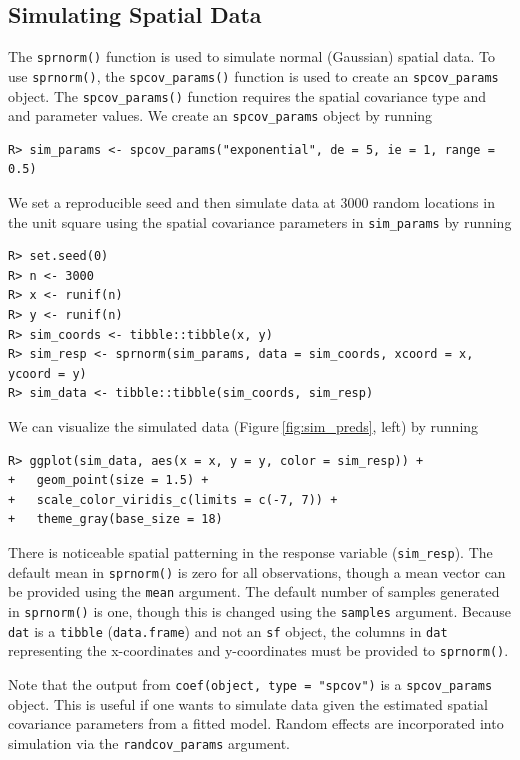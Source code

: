 \documentclass{article}
\begin{document}
\hypertarget{sec:sim_data}{%
\subsection{Simulating Spatial Data}\label{sec:sim_data}}

The \texttt{sprnorm()} function is used to simulate normal (Gaussian)
spatial data. To use \texttt{sprnorm()}, the \texttt{spcov\_params()}
function is used to create an \texttt{spcov\_params} object. The
\texttt{spcov\_params()} function requires the spatial covariance type
and and parameter values. We create an \texttt{spcov\_params} object by
running

\begin{verbatim}
R> sim_params <- spcov_params("exponential", de = 5, ie = 1, range = 0.5)
\end{verbatim}

We set a reproducible seed and then simulate data at 3000 random
locations in the unit square using the spatial covariance parameters in
\texttt{sim\_params} by running

\begin{verbatim}
R> set.seed(0)
R> n <- 3000
R> x <- runif(n)
R> y <- runif(n)
R> sim_coords <- tibble::tibble(x, y)
R> sim_resp <- sprnorm(sim_params, data = sim_coords, xcoord = x, ycoord = y)
R> sim_data <- tibble::tibble(sim_coords, sim_resp)
\end{verbatim}

We can visualize the simulated data (Figure\(~\)\ref{fig:sim_preds},
left) by running

\begin{verbatim}
R> ggplot(sim_data, aes(x = x, y = y, color = sim_resp)) +
+   geom_point(size = 1.5) +
+   scale_color_viridis_c(limits = c(-7, 7)) + 
+   theme_gray(base_size = 18)
\end{verbatim}

There is noticeable spatial patterning in the response variable
(\texttt{sim\_resp}). The default mean in \texttt{sprnorm()} is zero for
all observations, though a mean vector can be provided using the
\texttt{mean} argument. The default number of samples generated in
\texttt{sprnorm()} is one, though this is changed using the
\texttt{samples} argument. Because \texttt{dat} is a \texttt{tibble}
(\texttt{data.frame}) and not an \texttt{sf} object, the columns in
\texttt{dat} representing the x-coordinates and y-coordinates must be
provided to \texttt{sprnorm()}.

Note that the output from \texttt{coef(object,\ type\ =\ "spcov")} is a
\texttt{spcov\_params} object. This is useful if one wants to simulate
data given the estimated spatial covariance parameters from a fitted
model. Random effects are incorporated into simulation via the
\texttt{randcov\_params} argument.
\end{document}
